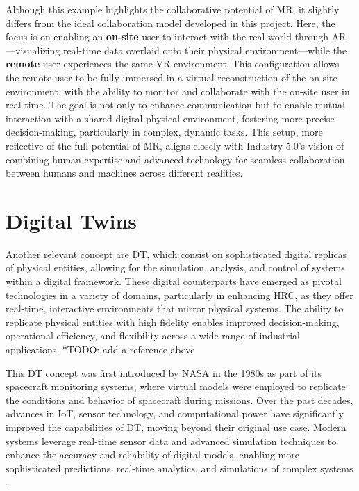     Although this example highlights the collaborative potential of \ac{MR}, it slightly differs from the ideal collaboration model developed in this project. Here, the focus is on enabling an \textbf{on-site} user to interact with the real world through \ac{AR}—visualizing real-time data overlaid onto their physical environment—while the \textbf{remote} user experiences the same \ac{VR} environment. This configuration allows the remote user to be fully immersed in a virtual reconstruction of the on-site environment, with the ability to monitor and collaborate with the on-site user in real-time. The goal is not only to enhance communication but to enable mutual interaction with a shared digital-physical environment, fostering more precise decision-making, particularly in complex, dynamic tasks. This setup, more reflective of the full potential of \ac{MR}, aligns closely with Industry 5.0’s vision of combining human expertise and advanced technology for seamless collaboration between humans and machines across different realities.

\section{Digital Twins}
\label{sec:dt}
Another relevant concept are \ac{DT}, which consist on sophisticated digital replicas of physical entities, allowing for the simulation, analysis, and control of systems within a digital framework. These digital counterparts have emerged as pivotal technologies in a variety of domains, particularly in enhancing \ac{HRC}, as they offer real-time, interactive environments that mirror physical systems. The ability to replicate physical entities with high fidelity enables improved decision-making, operational efficiency, and flexibility across a wide range of industrial applications.
*TODO: add a reference above

This \ac{DT} concept was first introduced by NASA in the 1980s as part of its spacecraft monitoring systems, where virtual models were employed to replicate the conditions and behavior of spacecraft during missions. Over the past decades, advances in \ac{IoT}, sensor technology, and computational power have significantly improved the capabilities of \ac{DT}, moving beyond their original use case. Modern systems leverage real-time sensor data and advanced simulation techniques to enhance the accuracy and reliability of digital models, enabling more sophisticated predictions, real-time analytics, and simulations of complex systems \cite{liu2022digitaltwin}.

